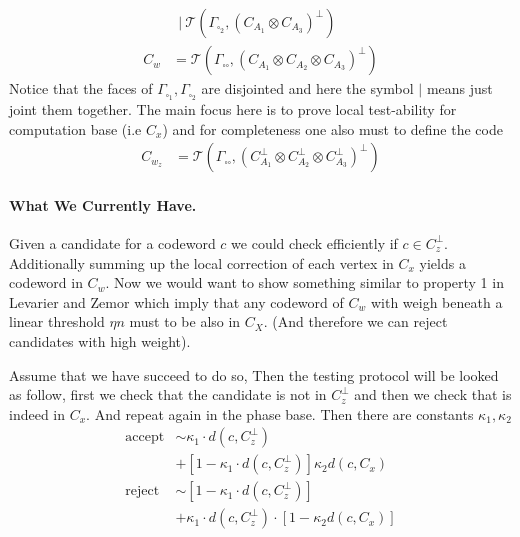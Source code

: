 \documentclass{article}
\begin{document}
\begin{multicols*}{2}
\begin{equation*}
\begin{split}
	    & \ \ | \ \mathcal{T}\left( \Gamma_{\square_{2}}, \left(  C_{A_1} \otimes C_{A_3} \right)^{\perp}  \right) \\
	    C_{w} &=  \mathcal{T}\left( \Gamma_{\square \square}, \left(  C_{A_1} \otimes C_{A_2} \otimes C_{A_3} \right)^{\perp}  \right)   
	  \end{split}
	\end{equation*}
	Notice that the faces of $\Gamma_{\square_{1}},\Gamma_{\square_{2}}$ are disjointed and here the symbol $|$ means just joint them together. 
	The main focus here is to prove local test-ability for computation base (i.e $C_{x}$) and for completeness one also must to define the code 
	\begin{equation*}
	  \begin{split}
	    C_{w_{z}} &=  \mathcal{T}\left( \Gamma_{\square \square}, \left(  C_{A_1}^\perp \otimes C_{A_2}^\perp \otimes C_{A_3}^\perp \right)^{\perp}  \right)   
	  \end{split}
	\end{equation*}
	\paragraph{What We Currently Have.} Given a candidate for a codeword $c$ we could check efficiently if $c\in C_{z}^\perp$.  
	Additionally summing up the local correction of each vertex in $C_{x}$ yields a codeword in $C_{w}$. Now we would want to show 
	something similar to property 1 in Levarier and Zemor which imply that any codeword of $C_{w}$ with weigh beneath 
	a linear threshold $\eta n $ must to be also in $C_{X}$. (And therefore we can reject candidates with high weight). 

	Assume that we have succeed to do so, Then the testing protocol will be looked as follow, 
	first we check that the candidate is not in $C_{z}^\perp$ and then we check that is indeed in $C_{x}$. And repeat again 
	in the phase base. Then there are constants $\kappa_1, \kappa_2$ 
	\begin{equation*}
	  \begin{split}
	    \text{accept} & \sim \kappa_1 \cdot  d\left( c,C_{z}^\perp \right)  \\ 
	    & +  \left[ 1 -  \kappa_1 \cdot  d\left( c,C_{z}^\perp \right)\right] \kappa_{2} d\left( c, C_{x} \right) \\
	    \text{reject} & \sim  \left[ 1 -  \kappa_1 \cdot  d\left( c,C_{z}^\perp \right)\right] \\ 
	    & +\kappa_1 \cdot  d\left( c,C_{z}^\perp \right) \cdot \left[ 1 - \kappa_{2} d\left( c, C_{x} \right) \right] 
	  \end{split}
	\end{equation*}

\end{multicols*}
\end{document}
